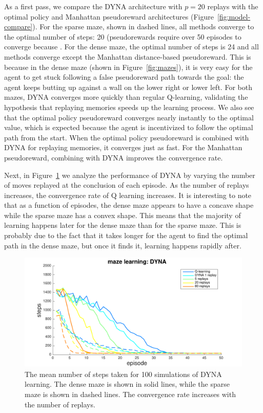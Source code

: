 \documentclass[notitlepage]{article}
\begin{document}
As a first pass, we compare the DYNA architecture with $p =20$ replays with the optimal policy and Manhattan pseudoreward architectures (Figure~\ref{fig:model-compare}). For the sparse maze, shown in dashed lines, all methods converge to the optimal number of steps: 20 (pseudorewards require over 50 episodes to converge because . For the dense maze, the optimal number of steps is 24 and all methods converge except the Manhattan distance-based pseudoreward. This is because in the dense maze (shown in Figure~\ref{fig:mazes}), it is very easy for the agent to get stuck following a false pseudoreward path towards the goal: the agent keeps butting up against a wall on the lower right or lower left. For both mazes, DYNA converges more quickly than regular Q-learning, validating the hypothesis that replaying memories speeds up the learning process. We also see that the optimal policy pseudoreward converges nearly instantly to the optimal value, which is expected because the agent is incentivized to follow the optimal path from the start. When the optimal policy pseudoreward is combined with DYNA for replaying memories, it converges just as fast. For the Manhattan pseudoreward, combining with DYNA improves the convergence rate. 

Next, in Figure~\ref{fig:dyna-compare} we analyze the performance of DYNA by varying the number of moves replayed at the conclusion of each episode. As the number of replays increases, the convergence rate of Q learning increases. It is interesting to note that as a function of episodes, the dense maze appears to have a concave shape while the sparse maze has a convex shape. This means that the majority of learning happens later for the dense maze than for the sparse maze. This is probably due to the fact that it takes longer for the agent to find the optimal path in the dense maze, but once it finds it, learning happens rapidly after. 

\begin{figure}[ht]
\includegraphics[width=\textwidth]{DYNAcompare}
\caption{The mean number of steps taken for 100 simulations of DYNA learning. The dense maze is shown in solid lines, while the sparse maze is shown in dashed lines. The convergence rate increases with the number of replays.}
\label{fig:dyna-compare}
\end{figure}
\end{document}
